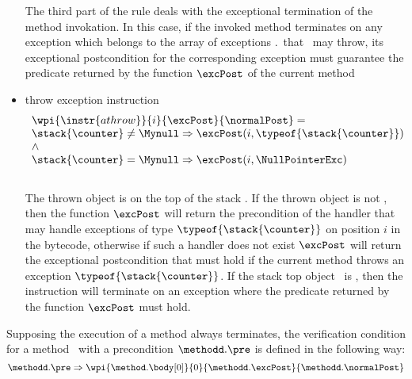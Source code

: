 \begin{itemize}
						The third part of the rule deals with the exceptional termination of the method invokation.
						In this case, if the invoked method terminates on any exception which belongs to the array of 
						exceptions \methodd.\exceptions \ that \methodd \ may throw, its exceptional postcondition
						for the corresponding exception
						must guarantee the predicate returned by the function $\excPost$ of the current method

						
						
						
					
\item throw exception instruction \\
				
							$$ \begin{array}{l}
							          \wpi{\instr{athrow }} {i} {\excPost}{\normalPost}  = \\
							          \stack{\counter} \neq \Mynull \Rightarrow  \excPost( i, \typeof{\stack{\counter}}) \\
								  \wedge \\
								  \stack{\counter} = \Mynull \Rightarrow  \excPost( i, \NullPointerExc) \\
							   \end{array}
							$$ \\
						The thrown object is on the top of the stack \stack{\counter}. If the thrown object is not \Mynull, then
						the function $\excPost$ will return the precondition of the handler that may handle exceptions of type 
						$\typeof{\stack{\counter} } $ on position $i$ in the bytecode, otherwise if such a handler does not exist 
						$\excPost$ will return the exceptional postcondition that must hold if the current method throws an exception
						$\typeof{\stack{\counter} } $. 
						If the stack top object \stack{\counter} \ is \Mynull, then the instruction \athrow will terminate on an exception
						\NullPointerExc where the predicate returned by the function $ \excPost$ must hold.
						
	 			
\end{itemize}


Supposing the execution of a method always terminates, the verification condition for a method \methodd \ with a
 precondition $\methodd.\pre$ is defined in the following way:
$$ \methodd.\pre \Rightarrow \wpi{\method.\body[0]}{0}{\methodd.\excPost}{\methodd.\normalPost}$$





